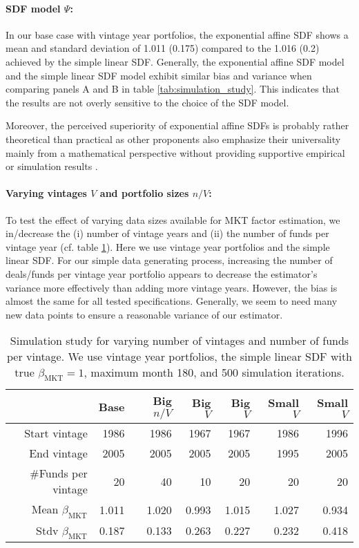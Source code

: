 \documentclass[12pt]{article}
\begin{document}
\paragraph{SDF model $\Psi$:}
In our base case with vintage year portfolios, the exponential affine SDF shows a mean and standard deviation of 1.011 (0.175) compared to the 1.016 (0.2) achieved by the simple linear SDF.
Generally, the exponential affine SDF model and the simple linear SDF model exhibit similar bias and variance when comparing panels A and B in table \ref{tab:simulation_study}.
This indicates that the results are not overly sensitive to the choice of the SDF model.

Moreover, the perceived superiority of exponential affine SDFs is probably rather theoretical than practical as other proponents also emphasize their universality mainly from a mathematical perspective without providing supportive empirical or simulation results \citep{GM07,BMP08}.

\paragraph{Varying vintages $V$ and portfolio sizes $n/V$:}
To test the effect of varying data sizes available for MKT factor estimation, we in/decrease the (i) number of vintage years and (ii) the number of funds per vintage year (cf. table \ref{tab:simulation_study_size}).
Here we use vintage year portfolios and the simple linear SDF.
For our simple data generating process, increasing the number of deals/funds per vintage year portfolio appears to decrease the estimator's variance more effectively than adding more vintage years.
However, the bias is almost the same for all tested specifications.
Generally, we seem to need many new data points to ensure a reasonable variance of our estimator.

\begin{table}[ht]
	\centering
	\begin{tabular}{rrrrrrr}
		& Base & Big $n/V$ & Big $V$ & Big $V$ & Small $V$ & Small $V$ \\ 
		\hline
		\hline
		Start vintage & 1986 & 1986 & 1967 & 1967 & 1986 & 1996 \\ 
		End vintage & 2005 & 2005 & 2005 & 2005 & 1995 & 2005 \\ 
		\#Funds per vintage & 20 & 40 & 10 & 20 & 20 & 20 \\ 
		\hline
		Mean $\beta_{\mathrm{MKT}}$ & 1.011 & 1.020 & 0.993 & 1.015 & 1.027 & 0.934 \\ 
		Stdv $\beta_{\mathrm{MKT}}$ & 0.187 & 0.133 & 0.263 & 0.227 & 0.232 & 0.418 \\ 
		\hline
		\hline
	\end{tabular}
	\caption{Simulation study for varying  number of vintages and number of funds per vintage. 
		   We use vintage year portfolios, the simple linear SDF with true $\beta_{\mathrm{MKT}}=1$, maximum month 180, and 500 simulation iterations.} 
	\label{tab:simulation_study_size}
\end{table}
\end{document}
